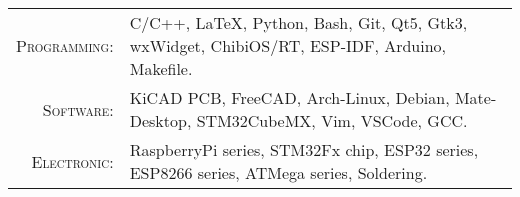 %
%



\renewcommand{\arraystretch}{1.1}

	\begin{tabular}{>{}r>{}p{13cm}}
		\textsc{Programming:} &  C/C++, \LaTeX, Python, Bash, Git, Qt5, Gtk3, wxWidget, ChibiOS/RT, ESP-IDF, Arduino, Makefile.\\
		\textsc{Software:}    &  KiCAD PCB, FreeCAD, Arch-Linux, Debian, Mate-Desktop, STM32CubeMX, Vim, VSCode, GCC.\\
		\textsc{Electronic:}  &  RaspberryPi series, STM32Fx chip, ESP32 series, ESP8266 series, ATMega series, Soldering.\\
	\end{tabular}